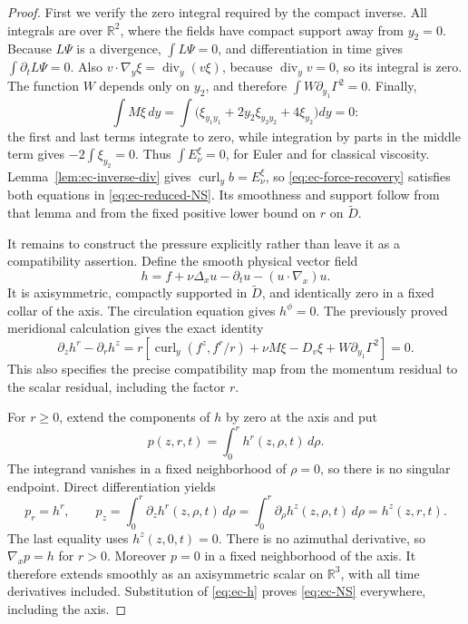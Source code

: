\begin{proof}
First we verify the zero integral required by the compact inverse.
All integrals are over \(\mathbb R^2\), where the fields have compact
support away from \(y_2=0\).  Because \(L\Psi\) is a divergence,
\(\int L\Psi=0\), and differentiation in time gives
\(\int\partial_tL\Psi=0\).  Also
\(v\cdot\nabla_y\xi=\operatorname{div}_y(v\xi)\), because
\(\operatorname{div}_yv=0\), so its integral is zero.  The function
\(W\) depends only on \(y_2\), and therefore
\(\int W\partial_{y_1}\Gamma^2=0\).  Finally,
\[
 \int M\xi\,dy
 =\int\bigl(\xi_{y_1y_1}+2y_2\xi_{y_2y_2}+4\xi_{y_2}\bigr)dy=0:
\]
the first and last terms integrate to zero, while integration by parts
in the middle term gives \(-2\int\xi_{y_2}=0\).
Thus \(\int E_\nu^\xi=0\), for Euler and for classical viscosity.
Lemma~\ref{lem:ec-inverse-div} gives
\(\operatorname{curl}_yb=E_\nu^\xi\), so
\eqref{eq:ec-force-recovery} satisfies both equations in
\eqref{eq:ec-reduced-NS}.  Its smoothness and support follow from that
lemma and from the fixed positive lower bound on \(r\) on
\(\widetilde D\).

It remains to construct the pressure explicitly rather than leave it
as a compatibility assertion.  Define the smooth physical vector field
\begin{equation}
 h=f+\nu\Delta_xu-\partial_tu-(u\cdot\nabla_x)u.
 \label{eq:ec-h}
\end{equation}
It is axisymmetric, compactly supported in \(\widetilde D\), and
identically zero in a fixed collar of the axis.  The circulation
equation gives \(h^\phi=0\).  The previously proved meridional
calculation gives the exact identity
\begin{equation}
 \partial_z h^r-\partial_r h^z
 =r\left[\operatorname{curl}_y(f^z,f^r/r)
        +\nu M\xi-D_v\xi+W\partial_{y_1}\Gamma^2\right]=0.
 \label{eq:ec-h-curl}
\end{equation}
This also specifies the precise compatibility map from the momentum
residual to the scalar residual, including the factor \(r\).

For \(r\geq0\), extend the components of \(h\) by zero at the axis
and put
\begin{equation}
 p(z,r,t)=\int_0^r h^r(z,\rho,t)\,d\rho.
 \label{eq:ec-pressure}
\end{equation}
The integrand vanishes in a fixed neighborhood of \(\rho=0\), so
there is no singular endpoint.  Direct differentiation yields
\[
 p_r=h^r,\qquad
 p_z=\int_0^r\partial_z h^r(z,\rho,t)\,d\rho
     =\int_0^r\partial_\rho h^z(z,\rho,t)\,d\rho=h^z(z,r,t).
\]
The last equality uses \(h^z(z,0,t)=0\).  There is no azimuthal
derivative, so \(\nabla_xp=h\) for \(r>0\).  Moreover \(p=0\)
in a fixed neighborhood of the axis.  It therefore extends smoothly
as an axisymmetric scalar on \(\mathbb R^3\), with all time
derivatives included.  Substitution of \eqref{eq:ec-h} proves
\eqref{eq:ec-NS} everywhere, including the axis.


\end{proof}
